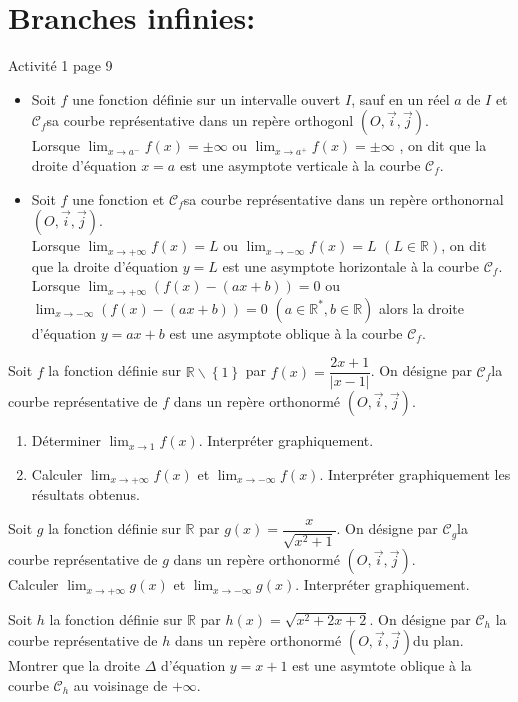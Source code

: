 \documentclass[12pt,a4paper,x11names,usenames,dvipsnames,svgnames,oneside]{book}
\def\R{\mathbb{R}}
\newcommand{\cf}{$ \mathscr{C}_{f} $}
\newcommand{\cg}{$ \mathscr{C}_{g} $}
\newcommand{\oij}{$ (O,\overrightarrow{i},\overrightarrow{j}) $}
\begin{document}
\section{Branches infinies:}
\begin{act}
Activité 1 page 9
\end{act}
\begin{df}
\begin{itemize}
\item Soit $f$ une fonction définie sur un intervalle ouvert $I$, sauf en un réel $a$ de $I$ et \cf  sa courbe représentative dans un repère orthogonl \oij.\\
Lorsque $\lim_{x\to a^-}f(x)=\pm \infty$ ou $\lim_{x\to a^+}f(x)=\pm \infty$ , on dit que la droite d'équation $x=a$ est une asymptote verticale à la courbe \cf.
\item Soit $f$ une fonction et \cf sa courbe représentative dans un repère orthonornal \oij.\\
Lorsque $\lim_{x\to+\infty}f(x)=L$ ou $\lim_{x\to-\infty}f(x)=L$ $(L\in\R)$, on dit que la droite d'équation $y=L$ est une asymptote horizontale à la courbe \cf.\\
Lorsque $\lim_{x\to+\infty}(f(x)-(ax+b))=0$ ou $\lim_{x\to-\infty}(f(x)-(ax+b))=0$ $(a\in\R^*, b\in\R)$ alors la droite d'équation $y=ax+b$ est une asymptote oblique à la courbe \cf.
\end{itemize}
\end{df}
\begin{exr}
Soit $f$ la fonction définie sur $\mathbb{R}\backslash \left\{ 1 \right\}$ par $f(x)=\dfrac{2x+1}{\left|x-1\right|}$. On désigne par \cf la courbe représentative de $f$ dans un repère orthonormé \oij.
\begin{enumerate}
\item Déterminer $\lim_{x\to 1}f(x)$. Interpréter graphiquement.
\item Calculer $\lim_{x\to+\infty}f(x)$ et $\lim_{x\to-\infty}f(x)$. Interpréter graphiquement les résultats obtenus.
\end{enumerate}
\end{exr}
\begin{exr}
Soit $g$ la fonction définie sur $\R$ par $g(x)=\dfrac{x}{\sqrt{x^2+1}}$. On désigne par \cg la courbe représentative de $g$ dans un repère orthonormé \oij.\\
Calculer $\lim_{x\to+\infty}g(x)$ et $\lim_{x\to-\infty}g(x)$. Interpréter graphiquement.
\end{exr}
\begin{exr}
Soit $h$ la fonction définie sur $\R$ par $h(x)=\sqrt{x^2+2x+2}$. On désigne par $\mathscr C_h$ la courbe représentative de $h$ dans un repère orthonormé \oij du plan.\\
Montrer que la droite $\Delta$ d'équation $y=x+1$ est une asymtote oblique à la courbe $\mathscr C_h$ au voisinage de $+\infty$.
\end{exr}
\end{document}
